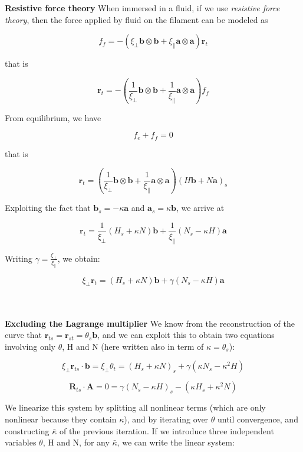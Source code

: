 \textbf{Resistive force theory}
When immersed in a fluid, if we use \emph{resistive force theory},
then the force applied by fluid on the filament can be modeled as

\[f_f = -( \xi_\perp \mathbf{b}\otimes \mathbf{b} +\xi_\parallel \mathbf{a}\otimes \mathbf{a}) \mathbf{r}_t\]

that is

\[\mathbf{r}_t = -\left( \frac{1}{\xi_\perp}  \mathbf{b}\otimes \mathbf{b} + \frac{1}{\xi_\parallel} \mathbf{a}\otimes \mathbf{a}\right) f_f\]

From equilibrium, we have

\[f_e+f_f = 0\]

that is

\[\mathbf{r}_t = \left( \frac{1}{\xi_\perp}  
\mathbf{b}\otimes \mathbf{b}  + \frac{1}{\xi_\parallel} \mathbf{a}\otimes \mathbf{a}\right) (H\mathbf{b} + N \mathbf{a})_s\]

Exploiting the fact that \(\mathbf{b}_s = - \kappa \mathbf{a}\) and \(\mathbf{a}_s = \kappa \mathbf{b}\), we
arrive at

\[\mathbf{r}_t =  \frac{1}{\xi_\perp} (H_s + \kappa N) \mathbf{b} + \frac{1}{\xi_\parallel}(N_s - \kappa H) \mathbf{a}\]

Writing $\gamma = \frac{\xi_\perp}{\xi_\parallel}$, we obtain:

\[\xi_\perp \mathbf{r}_t =   (H_s + \kappa N) \mathbf{b} + \gamma (N_s - \kappa H) \mathbf{a}\]

\\\\
\textbf{Excluding the Lagrange multiplier}
We know from the reconstruction of the curve that
\(\mathbf{r}_{ts} = \mathbf{r}_{st} = \theta_s \mathbf{b}\),
and we can exploit this to obtain two equations involving only
\(\theta\),
H
and N (here written also in term of $\kappa = \theta_s$):

\[ \xi_\perp \mathbf{r}_{ts}\cdot \mathbf{b} =\xi_\perp \theta_t =   (H_s + \kappa N)_s + \gamma (\kappa N_s - \kappa^2 H)\]

\[\mathbf{R}_{ts}\cdot \mathbf{A} = 0 =  \gamma(N_s - \kappa H)_s - (\kappa H_s + \kappa^2 N) \]

We linearize this system by splitting all nonlinear terms (which are
only nonlinear because they contain \(\kappa\)), and by iterating over
\(\theta\) until convergence, and constructing \(\bar\kappa\) of the
previous iteration. If we introduce three independent variables
\(\theta\), H and N, for any \(\bar\kappa\), we can write
the linear system:

